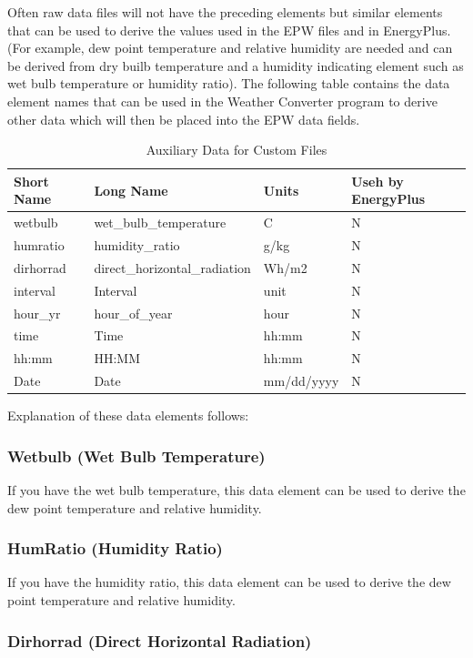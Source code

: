 Often raw data files will not have the preceding elements but similar elements that can be used to derive the values used in the EPW files and in EnergyPlus. (For example, dew point temperature and relative humidity are needed and can be derived from dry builb temperature and a humidity indicating element such as wet bulb temperature or humidity ratio). The following table contains the data element names that can be used in the Weather Converter program to derive other data which will then be placed into the EPW data fields.

\begin{longtable}[c]{p{1.5in}p{1.5in}p{1.5in}p{1.5in}}
\caption{Auxiliary Data for Custom Files \protect \label{table:auxiliary-data-for-custom-files}}\\
\toprule 
Short Name & Long Name & Units & Useh by EnergyPlus \tabularnewline \midrule
\endhead
wetbulb & wet\_bulb\_temperature & C & N \tabularnewline
humratio & humidity\_ratio & g/kg & N \tabularnewline
dirhorrad & direct\_horizontal\_radiation & Wh/m2 & N \tabularnewline
interval & Interval & unit & N \tabularnewline
hour\_yr & hour\_of\_year & hour & N \tabularnewline
time & Time & hh:mm & N \tabularnewline
hh:mm & HH:MM & hh:mm & N \tabularnewline
Date & Date & mm/dd/yyyy & N \tabularnewline
\bottomrule
\end{longtable}

Explanation of these data elements follows:

\subsubsection{Wetbulb (Wet Bulb Temperature)}\label{wetbulb-wet-bulb-temperature}

If you have the wet bulb temperature, this data element can be used to derive the dew point temperature and relative humidity.

\subsubsection{HumRatio (Humidity Ratio)}\label{humratio-humidity-ratio}

If you have the humidity ratio, this data element can be used to derive the dew point temperature and relative humidity.

\subsubsection{Dirhorrad (Direct Horizontal Radiation)}\label{dirhorrad-direct-horizontal-radiation}

